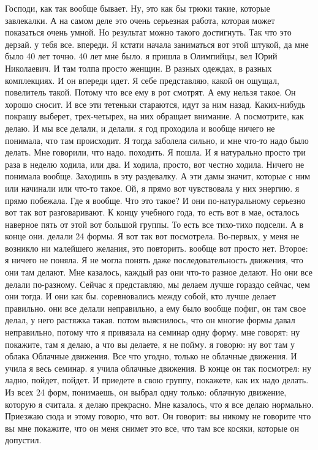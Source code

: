 Господи, как так вообще бывает.
Ну, это как бы трюки такие, которые завлекалки.
А на самом деле это очень серьезная работа, которая может показаться очень умной.
Но результат можно такого достигнуть.
Так что это дерзай.
у тебя все.
впереди.
Я кстати начала заниматься вот этой штукой, да мне было 40 лет точно.
40 лет мне было. я пришла в Олимпийцы, вел Юрий Николаевич.
И там толпа просто женщин.
В разных одеждах, в разных комплекциях.
И он впереди идет.
Я себе представляю, какой он ощущал, повелитель такой.
Потому что все ему в рот смотрят.
А ему нельзя такое.
Он хорошо сносит.
И все эти тетеньки стараются, идут за ним назад.
Каких-нибудь покрашу выберет, трех-четырех, на них обращает внимание.
А посмотрите, как делаю.
И мы все делали, и делали. я год проходила и вообще ничего не понимала, что там происходит.
Я тогда заболела сильно, и мне что-то надо было делать.
Мне говорили, что надо.
походить.
Я пошла.
И я натурально просто три раза в неделю ходила, или два.
И ходила, просто, вот честно ходила.
Ничего не понимала вообще.
Заходишь в эту раздевалку.
А эти дамы значит, которые с ним или начинали или что-то такое.
Ой, я прямо вот чувствовала у них энергию. я прямо побежала.
Где я вообще.
Что это такое?
И они по-натуральному серьезно вот так вот разговаривают.
К концу учебного года, то есть вот в мае, осталось наверное пять от этой вот большой группы.
То есть все тихо-тихо подсели.
А в конце они.
делали 24 формы.
Я вот так вот посмотрела.
Во-первых, у меня не возникло ни малейшего желания, это повторить. вообще вот просто нет.
Второе: я ничего не поняла.
Я не могла понять даже последовательность движения, что они там делают.
Мне казалось, каждый раз они что-то разное делают.
Но они все делали по-разному.
Сейчас я представляю, мы делаем лучше гораздо сейчас, чем они тогда.
И они как бы.
соревновались между собой, кто лучше делает правильно. они все делали неправильно, а ему было вообще пофиг, он там свое делал, у него растяжка такая. потом выяснилось, что он многие формы давал неправильно, потому что я привязала на семинар одну форму.
мне говорят: ну покажите, там я делаю, а что вы делаете, я не пойму. я говорю: ну вот там у облака Облачные движения.
Все что угодно, только не облачные движения.
И учила я весь семинар. я учила облачные движения.
В конце он так посмотрел: ну ладно, пойдет, пойдет.
И приедете в свою группу, покажете, как их надо делать.
Из всех 24 форм, понимаешь, он выбрал одну только: облачную движение, которую я считала. я делаю прекрасно.
Мне казалось, что я все делаю нормально.
Приезжаю сюда и этому говорю, что вот.
Он говорит: вы никому не говорите что вы мне покажите, что он меня снимет это все, что там все косяки, которые он допустил.
